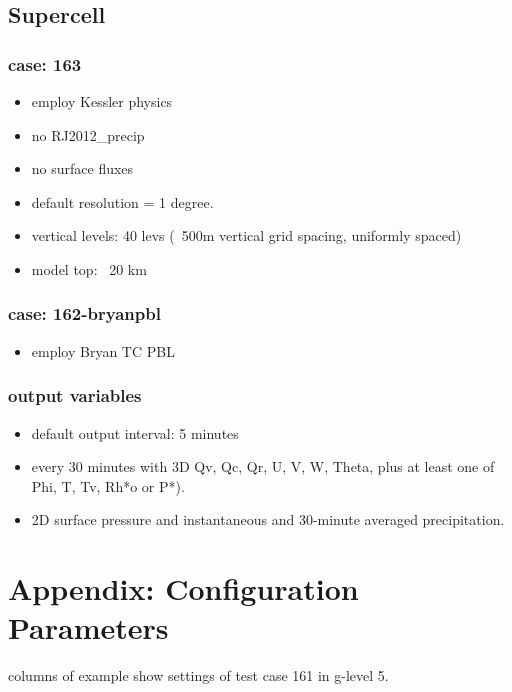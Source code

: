\documentclass[a4paper]{article}
\begin{document}
\subsection{Supercell}
\subsubsection{case: 163}
 \begin{itemize}
   \item employ Kessler physics
   \item no RJ2012\_precip
   \item no surface fluxes
   \item default resolution = 1 degree.
   \item vertical levels: 40 levs (~500m vertical grid spacing, uniformly spaced)
   \item model top: ~20 km
 \end{itemize}

\subsubsection{case: 162-bryanpbl}
 \begin{itemize}
   \item employ Bryan TC PBL
 \end{itemize}

\subsubsection{output variables}
 \begin{itemize}
   \item default output interval: 5 minutes
   \item every 30 minutes with 3D Qv, Qc, Qr, U, V, W, Theta,
         plus at least one of Phi, T, Tv, Rh*o or P*).
   \item 2D surface pressure and instantaneous and 30-minute averaged precipitation.
 \end{itemize}

\clearpage

\section{Appendix: Configuration Parameters}

 columns of example show settings of test case 161 in g-level 5. 
\end{document}
